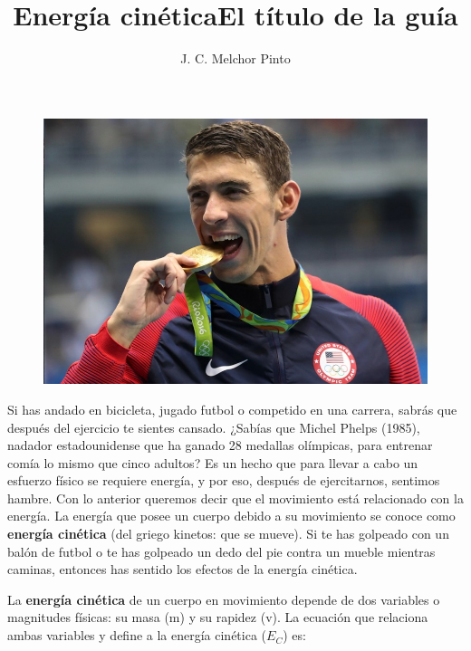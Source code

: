 \documentclass[12pt,addpoints,answers]{guia}
\title{Energía cinética}
\title{El título de la guía}
\author{J. C. Melchor Pinto}
\begin{document}
\pagestyle{headandfoot}

\INFO
\begin{opening}{
        \begin{minipage}{0.35\textwidth}
            \begin{figure}[H]
                \includegraphics[width=\linewidth]{../images/michael_phelps.jpg}
            \end{figure}
        \end{minipage}\hfill
        \begin{minipage}{0.6\textwidth}
            Si has andado en bicicleta, jugado futbol o competido en una carrera, sabrás
            que después del ejercicio te sientes cansado. ¿Sabías que Michel Phelps
            (1985), nadador estadounidense que ha ganado 28 medallas olímpicas, para
            entrenar comía lo mismo que cinco adultos? Es un hecho que para llevar a
            cabo un esfuerzo físico se requiere energía, y por eso, después de ejercitarnos, sentimos hambre.
            Con lo anterior queremos decir que el movimiento
            está relacionado con la energía. La energía que posee un cuerpo debido a
            su movimiento se conoce como \textbf{energía cinética} (del griego kinetos: que se
            mueve). Si te has golpeado con un balón de futbol o te has golpeado un dedo
            del pie contra un mueble mientras caminas, entonces has sentido los efectos de
            la energía cinética.\\
        \end{minipage}
        La \textbf{energ\'ia cin\'etica} de un cuerpo en movimiento depende de
        dos variables o magnitudes f\'isicas: su masa (m) y su rapidez (v). La ecuaci\'on
        que relaciona ambas variables y define a la energ\'ia cin\'etica ($E_C$) es:

}
\end{opening}
\end{document}
